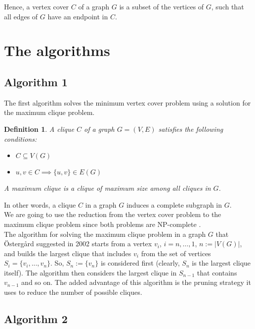 \documentclass[11pt,a4paper]{article}
\newtheorem*{definition}{Definition}
\begin{document}
Hence, a vertex cover $C$ of a graph $G$ is a subset of the vertices of $G$, such that all edges of $G$ have an endpoint in $C$. \\


\section{The algorithms}

\subsection{Algorithm 1}
The first algorithm solves the minimum vertex cover problem using a solution for the maximum clique problem.
\begin{definition}
A \emph{clique} $C$ of a graph $G=(V,E)$ satisfies the following conditions: \\

\begin{itemize}
\item $C \subseteq V(G)$
\item $u, v \in C \implies \{u, v\} \in E(G)$
\end{itemize}

A \emph{maximum clique} is a clique of maximum size among all cliques in $G$.
\end{definition}

In other words, a clique $C$ in a graph $G$ induces a complete subgraph in $G$. \\

We are going to use the reduction from the vertex cover problem to the maximum clique problem since both problems are NP-complete \cite{Patric}.\\

The algorithm for solving the maximum clique problem in a graph $G$ that Östergård suggested in 2002 starts from a vertex $v_i$, $i=n, \dots, 1$, $n :=|V(G)|$, and builds the largest clique that includes $v_i$ from the set of vertices $S_i = \{v_i, ..., v_n\}$. So, $S_n := \{v_n\}$ is considered first (clearly, $S_n$ is the largest clique itself). The algorithm then considers the largest clique in $S_{n-1}$ that contains $v_{n-1}$ and so on. The added advantage of this algorithm is the pruning strategy it uses to reduce the number of possible cliques.


\subsection{Algorithm 2}
\end{document}
